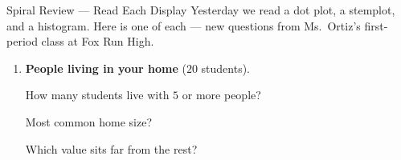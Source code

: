 \documentclass[12pt]{article}
\begin{document}

\vspace{0.15in}

\boxguard
\begin{notesbox}{Spiral Review --- Read Each Display}
\normalsize
Yesterday we read a dot plot, a stemplot, and a histogram. Here is one of each --- new
questions from Ms.~Ortiz's first-period class at Fox Run High.

\begin{enumerate}[leftmargin=1.8em, itemsep=30pt, topsep=10pt]

  \item \textbf{People living in your home} ($20$ students).\par\vspace{4pt}
        \begin{minipage}[t]{0.50\linewidth}\vspace{0pt}\centering
        \end{minipage}\hfill
        \begin{minipage}[t]{0.46\linewidth}\vspace{0pt}\raggedright
        How many students live with $5$ or more people? \par\vspace{10pt}
        Most common home size? \par\vspace{10pt}
        Which value sits far from the rest?\par{}
        \end{minipage}


\end{enumerate}
\end{notesbox}
\end{document}
